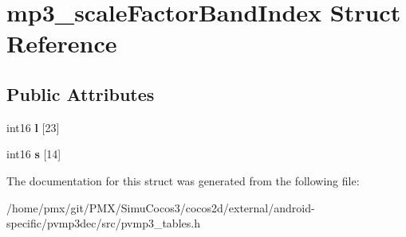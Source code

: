 \hypertarget{structmp3__scaleFactorBandIndex}{}\section{mp3\+\_\+scale\+Factor\+Band\+Index Struct Reference}
\label{structmp3__scaleFactorBandIndex}
\subsection*{Public Attributes}
\begin{DoxyCompactItemize}
\item 
\mbox{\label{structmp3__scaleFactorBandIndex_aa896f2a75c1f032fd4f99ba93d16be47}} 
int16 {\bfseries l} \mbox{[}23\mbox{]}
\item 
\mbox{\label{structmp3__scaleFactorBandIndex_a377eece2a4eed8b59c332ac1fc3b7563}} 
int16 {\bfseries s} \mbox{[}14\mbox{]}
\end{DoxyCompactItemize}


The documentation for this struct was generated from the following file\+:\begin{DoxyCompactItemize}
\item 
/home/pmx/git/\+P\+M\+X/\+Simu\+Cocos3/cocos2d/external/android-\/specific/pvmp3dec/src/pvmp3\+\_\+tables.\+h\end{DoxyCompactItemize}
